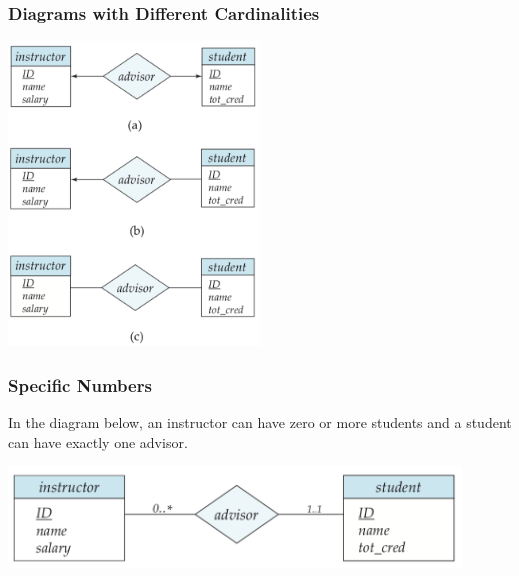 \begin{frame}
\frametitle{Diagrams with Different Cardinalities}

\begin{center}
\includegraphics[width=0.5\textwidth]{images/advisor-relationship}
\end{center}


\end{frame}


\begin{frame}
\frametitle{Specific Numbers}

In the diagram below, an instructor can have zero or more students and a student can have exactly one advisor.

\begin{center}
\includegraphics[width=0.9\textwidth]{images/cardinality-limits}
\end{center}

\end{frame}




